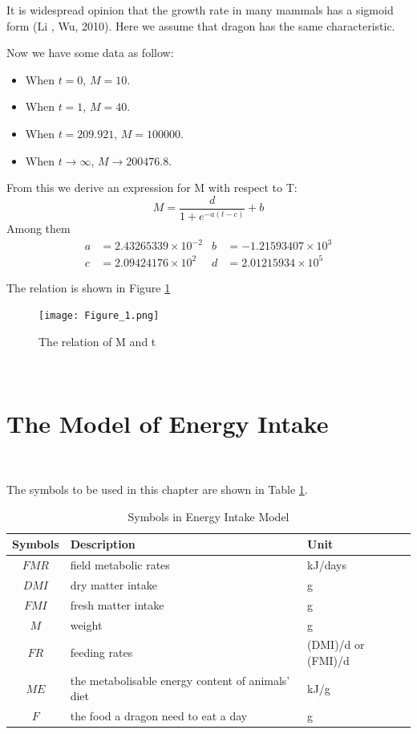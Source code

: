 \documentclass{mcmthesis}
\begin{document}
It is widespread opinion that the growth rate in many mammals has a sigmoid form (Li , Wu, 2010).
Here we assume that dragon has the same characteristic.

Now we have some data as follow:
\begin{itemize}
    \item When $t=0$, $M=10$.
    \item When $t=1$, $M=40$.
    \item When $t=209.921$, $M=100000$.
    \item When $t\rightarrow \infty $, $M\rightarrow 200476.8$.
\end{itemize}

From this we derive an expression for M with respect to T:
\begin{equation}
    M=\frac{d}{1+e^{-a(t-c)}}+b
\end{equation}
Among them
\begin{align*}
a&=2.43265339\times10^{-2} & b&=-1.21593407\times10^{3}\\
c&=2.09424176\times10^{2} & d&=2.01215934\times10^{5}
\end{align*}

The relation is shown in Figure \ref{Figure_1}
\begin{figure}[!htbp]
\centering
\texttt{[image: Figure\_1.png]}
\caption{The relation of M and t}\label{Figure_1}
\end{figure}

~\ \
\section{The Model of Energy Intake}
~\ \

The symbols to be used in this chapter are shown in Table \ref{tb:Variables2}.
\begin{table}[h]
\centering
\caption{Symbols in Energy Intake Model}
\begin{tabular}{cll}
\toprule
\textbf{Symbols}   & \textbf{Description}                                &\textbf{Unit}   \\
\midrule
$FMR$              & field metabolic rates                               &kJ/days             \\
$DMI$              & dry matter intake                                   &g                   \\
$FMI$              & fresh matter intake                                 &g                   \\
$M$                & weight                                              &g                   \\
$FR$               & feeding rates                                       &(DMI)/d or (FMI)/d  \\
$ME$               & the metabolisable energy content of animals' diet   &kJ/g                \\
$F$                & the food a dragon need to eat a day                 &g                   \\
\bottomrule
\end{tabular}\label{tb:Variables2}
\end{table}
\end{document}
